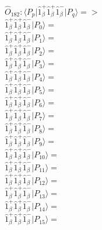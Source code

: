 \documentclass[14pt]{article}
\begin{document}
    $\hat{O}_{182}:  \langle{P_p}\vert \hat{1}_{\beta}^{+}\hat{1}_{\beta}^{+}\hat{1}_{\beta}^{-} \vert{P_q}\rangle => $ \\ 
    $ \hat{1}_{\beta}^{+}\hat{1}_{\beta}^{+}\hat{1}_{\beta}^{-} \vert{P_{0}}\rangle =  $ \\ 
    $ \hat{1}_{\beta}^{+}\hat{1}_{\beta}^{+}\hat{1}_{\beta}^{-} \vert{P_{1}}\rangle =  $ \\ 
    $ \hat{1}_{\beta}^{+}\hat{1}_{\beta}^{+}\hat{1}_{\beta}^{-} \vert{P_{2}}\rangle =  $ \\ 
    $ \hat{1}_{\beta}^{+}\hat{1}_{\beta}^{+}\hat{1}_{\beta}^{-} \vert{P_{3}}\rangle =  $ \\ 
    $ \hat{1}_{\beta}^{+}\hat{1}_{\beta}^{+}\hat{1}_{\beta}^{-} \vert{P_{4}}\rangle =  $ \\ 
    $ \hat{1}_{\beta}^{+}\hat{1}_{\beta}^{+}\hat{1}_{\beta}^{-} \vert{P_{5}}\rangle =  $ \\ 
    $ \hat{1}_{\beta}^{+}\hat{1}_{\beta}^{+}\hat{1}_{\beta}^{-} \vert{P_{6}}\rangle =  $ \\ 
    $ \hat{1}_{\beta}^{+}\hat{1}_{\beta}^{+}\hat{1}_{\beta}^{-} \vert{P_{7}}\rangle =  $ \\ 
    $ \hat{1}_{\beta}^{+}\hat{1}_{\beta}^{+}\hat{1}_{\beta}^{-} \vert{P_{8}}\rangle =  $ \\ 
    $ \hat{1}_{\beta}^{+}\hat{1}_{\beta}^{+}\hat{1}_{\beta}^{-} \vert{P_{9}}\rangle =  $ \\ 
    $ \hat{1}_{\beta}^{+}\hat{1}_{\beta}^{+}\hat{1}_{\beta}^{-} \vert{P_{10}}\rangle =  $ \\ 
    $ \hat{1}_{\beta}^{+}\hat{1}_{\beta}^{+}\hat{1}_{\beta}^{-} \vert{P_{11}}\rangle =  $ \\ 
    $ \hat{1}_{\beta}^{+}\hat{1}_{\beta}^{+}\hat{1}_{\beta}^{-} \vert{P_{12}}\rangle =  $ \\ 
    $ \hat{1}_{\beta}^{+}\hat{1}_{\beta}^{+}\hat{1}_{\beta}^{-} \vert{P_{13}}\rangle =  $ \\ 
    $ \hat{1}_{\beta}^{+}\hat{1}_{\beta}^{+}\hat{1}_{\beta}^{-} \vert{P_{14}}\rangle =  $ \\ 
    $ \hat{1}_{\beta}^{+}\hat{1}_{\beta}^{+}\hat{1}_{\beta}^{-} \vert{P_{15}}\rangle =  $ \\ 
    
\end{document}
